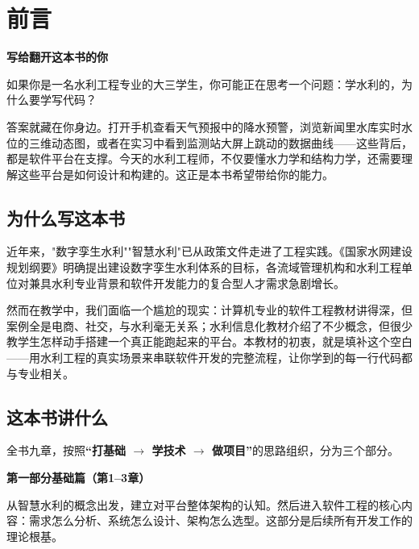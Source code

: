 \chapter*{前言}

\begin{notebox}
\textbf{写给翻开这本书的你}

如果你是一名水利工程专业的大三学生，你可能正在思考一个问题：学水利的，为什么要学写代码？

答案就藏在你身边。打开手机查看天气预报中的降水预警，浏览新闻里水库实时水位的三维动态图，或者在实习中看到监测站大屏上跳动的数据曲线——这些背后，都是软件平台在支撑。今天的水利工程师，不仅要懂水力学和结构力学，还需要理解这些平台是如何设计和构建的。这正是本书希望带给你的能力。
\end{notebox}

\section*{为什么写这本书}

近年来，"数字孪生水利""智慧水利"已从政策文件走进了工程实践。《国家水网建设规划纲要》明确提出建设数字孪生水利体系的目标，各流域管理机构和水利工程单位对兼具水利专业背景和软件开发能力的复合型人才需求急剧增长。

然而在教学中，我们面临一个尴尬的现实：计算机专业的软件工程教材讲得深，但案例全是电商、社交，与水利毫无关系；水利信息化教材介绍了不少概念，但很少教学生怎样动手搭建一个真正能跑起来的平台。本教材的初衷，就是填补这个空白——用水利工程的真实场景来串联软件开发的完整流程，让你学到的每一行代码都与专业相关。

\section*{这本书讲什么}

全书九章，按照\textbf{“打基础 $\rightarrow$ 学技术 $\rightarrow$ 做项目”}的思路组织，分为三个部分。

\begin{importantbox}
\textbf{第一部分\quad 基础篇（第1--3章）}

从智慧水利的概念出发，建立对平台整体架构的认知。然后进入软件工程的核心内容：需求怎么分析、系统怎么设计、架构怎么选型。这部分是后续所有开发工作的理论根基。
\end{importantbox}


